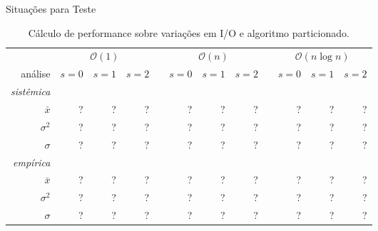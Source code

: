 \begin{frame}{Situações para Teste}

\begin{table}\centering
    \scriptsize
    \caption{Cálculo de performance sobre variações em I/O e algoritmo particionado.}
    \begin{tabular}{@{}rrrrcrrrcrrr@{}}\toprule
        & \multicolumn{3}{c}{$\mathcal{O}(1)$} && \multicolumn{3}{c}{$\mathcal{O}(n)$} & & \multicolumn{3}{c}{$\mathcal{O}(n\log n)$}\\
        \cmidrule{2-4} \cmidrule{6-8} \cmidrule{10-12}análise& $s=0$ & $s=1$ & $s=2$ && $s=0$ & $s=1$ & $s=2$ &&$s=0$ & $s=1$ & $s=2$ \\
        \midrule \textit{sistêmica} \\
        $\bar{x}$     & ? & ? & ? && ? & ? & ? && ? & ? & ? \\
        $\sigma^2$ & ? & ? & ? && ? & ? & ? && ? & ? & ? \\
        $\sigma$ & ? & ? & ? && ? & ? & ? && ? & ? & ? \\
        \midrule \textit{empírica} \\
        $\bar{x}$     & ? & ? & ? && ? & ? & ? && ? & ? & ? \\
        $\sigma^2$ & ? & ? & ? && ? & ? & ? && ? & ? & ? \\
        $\sigma$ & ? & ? & ? && ? & ? & ? && ? & ? & ? \\
        \bottomrule
    \end{tabular}
\end{table}
\end{frame}